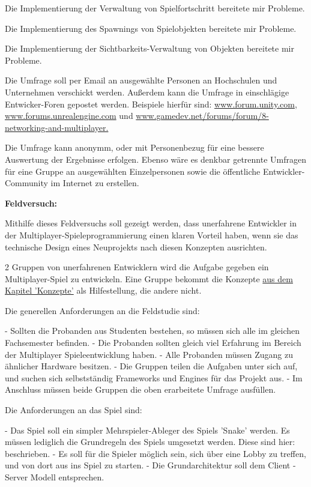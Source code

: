 Die Implementierung der Verwaltung von Spielfortschritt bereitete mir Probleme.

Die Implementierung des Spawnings von Spielobjekten bereitete mir Probleme.

Die Implementierung der Sichtbarkeits-Verwaltung von Objekten bereitete mir Probleme.

Die Umfrage soll per Email an ausgewählte Personen an Hochschulen und Unternehmen verschickt werden. Außerdem kann die Umfrage in einschlägige Entwicker-Foren gepostet werden. Beispiele hierfür sind: \href{www.forum.unity.com}{www.forum.unity.com}, \href{www.forums.unrealengine.com}{www.forums.unrealengine.com} und \href{www.gamedev.net/forums/forum/8-networking-and-multiplayer}{www.gamedev.net/forums/forum/8-networking-and-multiplayer.}

Die Umfrage kann anonymm, oder mit Personenbezug für eine bessere Auswertung der Ergebnisse erfolgen. Ebenso wäre es denkbar getrennte Umfragen für eine Gruppe an ausgewählten Einzelpersonen sowie die öffentliche Entwickler-Community im Internet zu erstellen.

\textbf{Feldversuch:}

Mithilfe dieses Feldversuchs soll gezeigt werden, dass unerfahrene Entwickler in der Multiplayer-Spieleprogrammierung einen klaren Vorteil haben, wenn sie das technische Design eines Neuprojekts nach diesen Konzepten ausrichten. 

2 Gruppen von unerfahrenen Entwicklern wird die Aufgabe gegeben ein Multiplayer-Spiel zu entwickeln. Eine Gruppe bekommt die Konzepte \hyperref[sec:konzepte]{aus dem Kapitel 'Konzepte'} als Hilfestellung, die andere nicht.

Die generellen Anforderungen an die Feldstudie sind:

- Sollten die Probanden aus Studenten bestehen, so müssen sich alle im gleichen Fachsemester befinden.
- Die Probanden sollten gleich viel Erfahrung im Bereich der Multiplayer Spieleentwicklung haben.
- Alle Probanden müssen Zugang zu ähnlicher Hardware besitzen.
- Die Gruppen teilen die Aufgaben unter sich auf, und suchen sich selbstständig Frameworks und Engines für das Projekt aus.
- Im Anschluss müssen beide Gruppen die oben erarbeitete Umfrage ausfüllen.

Die Anforderungen an das Spiel sind:

- Das Spiel soll ein simpler Mehrspieler-Ableger des Spiels 'Snake' werden. Es müssen lediglich die Grundregeln des Spiels umgesetzt werden. Diese sind hier: \cite{.22.02.2022} beschrieben.
- Es soll für die Spieler möglich sein, sich über eine Lobby zu treffen, und von dort aus ins Spiel zu starten.
- Die Grundarchitektur soll dem Client - Server Modell entsprechen.


